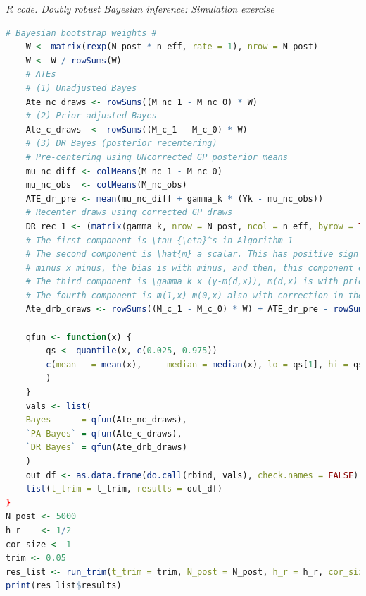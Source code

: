 \begin{enumerate}[leftmargin=*]
\begin{tcolorbox}[enhanced,width=4.67in,center upper,
fontupper=\large\bfseries,drop shadow southwest,sharp corners]
\textit{R code. Doubly robust Bayesian inference: Simulation exercise}
\begin{VF}
\begin{lstlisting}[language=R]	
	# Bayesian bootstrap weights #
	W <- matrix(rexp(N_post * n_eff, rate = 1), nrow = N_post)
	W <- W / rowSums(W)
	# ATEs
	# (1) Unadjusted Bayes
	Ate_nc_draws <- rowSums((M_nc_1 - M_nc_0) * W)
	# (2) Prior-adjusted Bayes
	Ate_c_draws  <- rowSums((M_c_1 - M_c_0) * W)
	# (3) DR Bayes (posterior recentering)
	# Pre-centering using UNcorrected GP posterior means
	mu_nc_diff <- colMeans(M_nc_1 - M_nc_0)                
	mu_nc_obs  <- colMeans(M_nc_obs)                       
	ATE_dr_pre <- mean(mu_nc_diff + gamma_k * (Yk - mu_nc_obs))
	# Recenter draws using corrected GP draws
	DR_rec_1 <- (matrix(gamma_k, nrow = N_post, ncol = n_eff, byrow = TRUE)) * (matrix(Yk, nrow = N_post, ncol = n_eff, byrow = TRUE) - M_c_obs)
	# The first component is \tau_{\eta}^s in Algorithm 1
	# The second component is \hat{m} a scalar. This has positive sign because
	# minus x minus, the bias is with minus, and then, this component enters with minus in the bias term
	# The third component is \gamma_k x (y-m(d,x)), m(d,x) is with prior correction
	# The fourth component is m(1,x)-m(0,x) also with correction in the prior
	Ate_drb_draws <- rowSums((M_c_1 - M_c_0) * W) + ATE_dr_pre - rowSums(DR_rec_1) / n_eff - rowSums(M_c_1 - M_c_0) / n_eff
	
	qfun <- function(x) {
		qs <- quantile(x, c(0.025, 0.975))
		c(mean   = mean(x), 	median = median(x), lo = qs[1],	hi = qs[2],	len = diff(qs)
		)
	}	
	vals <- list(
	Bayes      = qfun(Ate_nc_draws),
	`PA Bayes` = qfun(Ate_c_draws),
	`DR Bayes` = qfun(Ate_drb_draws)
	)
	out_df <- as.data.frame(do.call(rbind, vals), check.names = FALSE)
	list(t_trim = t_trim, results = out_df)
}
N_post <- 5000
h_r    <- 1/2
cor_size <- 1
trim <- 0.05
res_list <- run_trim(t_trim = trim, N_post = N_post, h_r = h_r, cor_size = cor_size)
print(res_list$results)
\end{lstlisting}
\end{VF}
\end{tcolorbox} 


\end{enumerate}